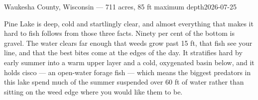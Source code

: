 


  {Waukesha County, Wisconsin --- 711 acres, 85 ft maximum depth}{2026-07-25}



Pine Lake is deep, cold and startlingly clear, and almost everything that makes
it hard to fish follows from those three facts. Ninety per cent of the bottom is
gravel. The water clears far enough that weeds grow past 15 ft, that fish see
your line, and that the best bites come at the edges of the day. It stratifies
hard by early summer into a warm upper layer and a cold, oxygenated basin below,
and it holds cisco --- an open-water forage fish --- which means the biggest
predators in this lake spend much of the summer suspended over 60 ft of water
rather than sitting on the weed edge where you would like them to be.

\begin{telosfacts}[0.20]
\end{telosfacts}

